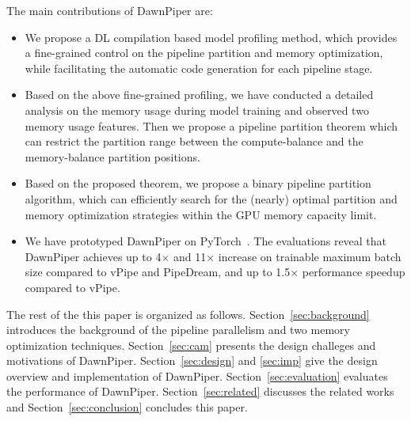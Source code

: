 The main contributions of DawnPiper are:
\begin{itemize}
  \item We propose a DL compilation based model profiling method,
        which provides a fine-grained control on the pipeline partition and memory optimization,
        while facilitating the automatic code generation for each pipeline stage.
  \item Based on the above fine-grained profiling, we have conducted a detailed analysis on
        the memory usage during model training and observed two memory usage features.
        Then we propose a pipeline partition theorem which can restrict the partition range
        between the compute-balance and the memory-balance partition positions.
  \item Based on the proposed theorem, we propose a binary pipeline partition algorithm,
        which can efficiently search for the (nearly) optimal partition and memory optimization
        strategies within the GPU memory capacity limit.
  \item We have prototyped DawnPiper on PyTorch~\cite{paszkePytorchImperativeStyle2019}. The evaluations reveal that DawnPiper
        achieves up to 4$\times$ and 11$\times$ increase on trainable maximum batch size
        compared to vPipe and PipeDream, and up to 1.5$\times$ performance speedup compared to vPipe.
\end{itemize}

The rest of the this paper is organized as follows.
Section~\ref{sec:background} introduces the background of
the pipeline parallelism and two memory optimization techniques.
Section~\ref{sec:cam} presents the design challeges and motivations of DawnPiper.
Section~\ref{sec:design} and \ref{sec:imp} give the design overview and
implementation of DawnPiper.
Section~\ref{sec:evaluation} evaluates the performance of DawnPiper.
Section~\ref{sec:related} discusses the related works
and Section~\ref{sec:conclusion} concludes this paper.
\label{sec:intro}
